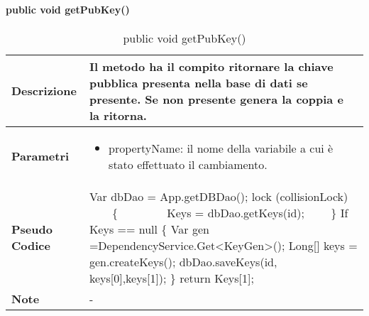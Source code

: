 \paragraph{public void getPubKey()}
\begin{center}
    \begin{longtable}{|p{3cm}|p{9cm}|}%
    \caption{public void getPubKey()}
    \endfirsthead
    \endhead
    \hline
    \textbf{Descrizione} & Il metodo ha il compito ritornare la chiave pubblica presenta nella base di dati se presente. Se non presente genera la coppia e la ritorna.\\
    \hline
    \textbf{Parametri} &      
    \begin{itemize}
        \item propertyName: il nome della variabile a cui è stato effettuato il cambiamento.
    \end{itemize}
    \\
    \hline
    \textbf{Pseudo Codice} & 
    Var dbDao = App.getDBDao();\newline
    lock (collisionLock)\newline
        \{\newline
            Keys = dbDao.getKeys(id);\newline
        \}\newline
    If Keys == null \{\newline
        Var gen =DependencyService.Get<KeyGen>();\newline
        Long[] keys =  gen.createKeys();\newline
    dbDao.saveKeys(id, keys[0],keys[1]);\newline
    \} \newline
    return Keys[1];\newline
    \\
    \hline
    \textbf{Note} & 
    -
    \\
    \hline
    \end{longtable}
    \end{center}



